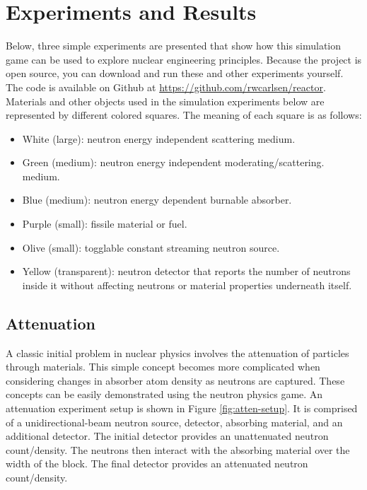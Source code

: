 \documentclass{anstrans}
\begin{document}
\section{Experiments and Results}

Below, three simple experiments are presented that show how this simulation
game can be used to explore nuclear engineering principles.  Because the
project is open source, you can download and run these and other
experiments yourself.  The code is available on Github at
\url{https://github.com/rwcarlsen/reactor}.  Materials and other objects used
in the simulation experiments below are represented by different colored
squares.  The meaning of each square is as follows:

\begin{itemize}
        
    \item White (large): neutron energy independent scattering medium.

    \item Green (medium): neutron energy independent moderating/scattering.
        medium.

    \item Blue (medium): neutron energy dependent burnable absorber.

    \item Purple (small): fissile material or fuel.

    \item Olive (small): togglable constant streaming neutron source.

    \item Yellow (transparent): neutron detector that reports the number of
        neutrons inside it without affecting neutrons or material properties
        underneath itself.

\end{itemize}


\subsection{Attenuation}

A classic initial problem in nuclear physics involves the attenuation of
particles through materials. This simple concept becomes more complicated when
considering changes in absorber atom density as neutrons are captured. These
concepts can be easily demonstrated using the neutron physics game.  An
attenuation experiment setup is shown in Figure \ref{fig:atten-setup}. It is
comprised of a unidirectional-beam neutron source, detector, absorbing
material, and an additional detector. The initial detector provides an
unattenuated neutron count/density. The neutrons then interact with the
absorbing material over the width of the block. The final detector provides an
attenuated neutron count/density.
\end{document}
